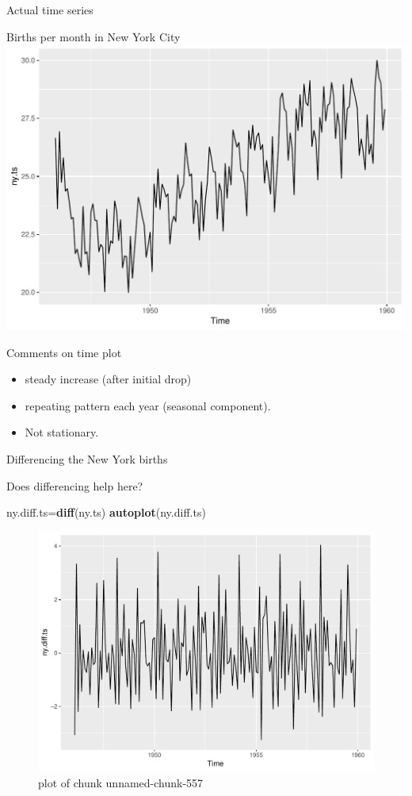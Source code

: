 \documentclass[ignorenonframetext,]{beamer}
\newenvironment{Shaded}{\begin{snugshade}}{\end{snugshade}}
\newcommand{\KeywordTok}[1]{\textcolor[rgb]{0.13,0.29,0.53}{\textbf{#1}}}
\newcommand{\NormalTok}[1]{#1}
\providecommand{\tightlist}{%
  \setlength{\itemsep}{0pt}\setlength{\parskip}{0pt}}
\begin{document}
\begin{frame}[fragile]{Actual time series}
\begin{block}{Births per month in New York City}
\includegraphics{figure/unnamed-chunk-556-1.pdf}

Comments on time plot

\begin{itemize}
\tightlist
\item
  steady increase (after initial drop)
\item
  repeating pattern each year (seasonal component).
\item
  Not stationary.
\end{itemize}

Differencing the New York births

Does differencing help here?

\begin{Shaded}
\begin{Highlighting}[]
\NormalTok{ny.diff.ts=}\KeywordTok{diff}\NormalTok{(ny.ts)}
\KeywordTok{autoplot}\NormalTok{(ny.diff.ts)}
\end{Highlighting}
\end{Shaded}

\begin{figure}
\centering
\includegraphics{figure/unnamed-chunk-557-1.pdf}
\caption{plot of chunk unnamed-chunk-557}
\end{figure}


\end{block}
\end{frame}
\end{document}
